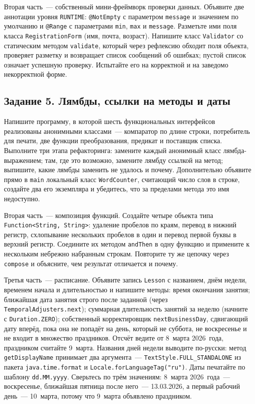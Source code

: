 Вторая часть~--- собственный мини-фреймворк проверки данных. Объявите две
аннотации уровня \texttt{RUNTIME}: \texttt{@NotEmpty} с параметром
\texttt{message} и значением по умолчанию и \texttt{@Range} с параметрами
\texttt{min}, \texttt{max} и \texttt{message}. Разметьте ими поля класса
\texttt{RegistrationForm} (имя, почта, возраст). Напишите класс
\texttt{Validator} со статическим методом \texttt{validate}, который через
рефлексию обходит поля объекта, проверяет разметку и возвращает список
сообщений об ошибках; пустой список означает успешную проверку. Испытайте его
на корректной и на заведомо некорректной форме.

\subsection*{Задание 5. Лямбды, ссылки на методы и даты}

Напишите программу, в которой шесть функциональных интерфейсов реализованы
анонимными классами~--- компаратор по длине строки, потребитель для печати,
две функции преобразования, предикат и поставщик списка. Выполните три этапа
рефакторинга: замените каждый анонимный класс лямбда-выражением; там, где это
возможно, замените лямбду ссылкой на метод; выпишите, какие лямбды заменить
не удалось и почему. Дополнительно объявите прямо в \texttt{main} локальный
класс \texttt{WordCounter}, считающий число слов в строке, создайте два его
экземпляра и убедитесь, что за пределами метода это имя недоступно.

Вторая часть~--- композиция функций. Создайте четыре объекта типа
\texttt{Function<String, String>}: удаление пробелов по краям, перевод в нижний
регистр, схлопывание нескольких пробелов в один и перевод первой буквы в
верхний регистр. Соедините их методом \texttt{andThen} в одну функцию и
примените к нескольким небрежно набранным строкам. Повторите ту же цепочку
через \texttt{compose} и объясните, чем результат отличается и почему.

Третья часть~--- расписание. Объявите запись \texttt{Lesson} с названием,
днём недели, временем начала и длительностью и напишите методы: время
окончания занятия; ближайшая дата занятия строго после заданной (через
\texttt{TemporalAdjusters.next}); суммарная длительность занятий за неделю
(начните с \texttt{Duration.ZERO}); собственный корректировщик
\texttt{nextBusinessDay}, сдвигающий дату вперёд, пока она не попадёт на
день, который не суббота, не воскресенье и не входит в множество праздников.
Отсчёт ведите от 8~марта 2026~года, праздником считайте 9~марта. Названия дней
недели выводите по-русски: метод \texttt{getDisplayName} принимает два
аргумента~--- \texttt{TextStyle.FULL\_STANDALONE} из пакета
\texttt{java.time.format} и \texttt{Locale.forLanguageTag("ru")}. Даты
печатайте по шаблону \texttt{dd.MM.yyyy}. Сверьтесь по трём значениям:
8~марта 2026~года~--- воскресенье, ближайшая пятница после него~---
13.03.2026, а первый рабочий день~--- 10~марта, потому что 9~марта объявлено
праздником.

